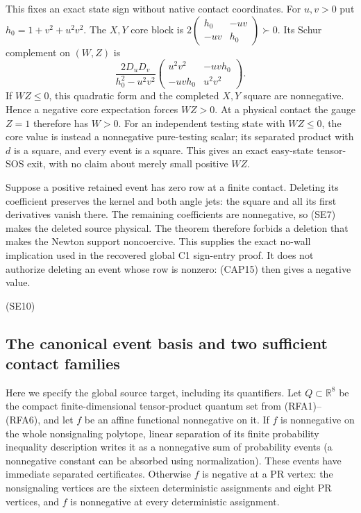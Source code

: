 This fixes an exact state sign without native contact coordinates.
For $u,v>0$ put $h_0=1+v^2+u^2v^2$.  The $X,Y$ core block is
$2\left(\begin{smallmatrix}h_0&-uv\\-uv&h_0\end{smallmatrix}\right)
\succ0$.  Its Schur complement on $(W,Z)$ is
\[
\frac{2D_uD_v}{h_0^2-u^2v^2}
\begin{pmatrix}u^2v^2&-uvh_0\\-uvh_0&u^2v^2\end{pmatrix}.
\tag{SE9}
\]
If $WZ\leq0$, this quadratic form and the completed $X,Y$ square
are nonnegative.  Hence a negative core expectation forces $WZ>0$.
At a physical contact the gauge $Z=1$ therefore has $W>0$.
For an independent testing state with $WZ\leq0$, the core value is
instead a nonnegative pure-testing scalar; its separated product with
$d$ is a square, and every event is a square.  This gives an exact
easy-state tensor-SOS exit, with no claim about merely small positive
$WZ$.

Suppose a positive retained event has zero row at a finite contact.
Deleting its coefficient preserves the kernel and both angle jets:
the square and all its first derivatives vanish there.  The remaining
coefficients are nonnegative, so (SE7) makes the deleted source physical.
The theorem therefore forbids a deletion that makes the Newton support
noncoercive.  This supplies the exact no-wall implication used in the
recovered global C1 sign-entry proof.  It does not authorize deleting
an event whose row is nonzero: (CAP15) then gives a negative value.
\par\noindent\hfill\textup{(SE10)}\par

\subsection{The canonical event basis and two sufficient contact families}

Here we specify the global source target, including its quantifiers.
Let $Q\subset\mathbb R^8$ be the compact finite-dimensional
tensor-product quantum set from (RFA1)--(RFA6), and let $f$ be an affine
functional nonnegative on it.  If $f$ is nonnegative on the whole
nonsignaling polytope, linear separation of its finite probability
inequality description writes it as a nonnegative sum of probability
events (a nonnegative constant can be absorbed using normalization).
These events have immediate separated certificates.  Otherwise $f$ is
negative at a PR vertex: the nonsignaling vertices are the sixteen
deterministic assignments and eight PR vertices, and $f$ is nonnegative
at every deterministic assignment.

